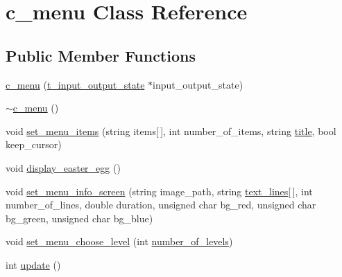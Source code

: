 \hypertarget{classc__menu}{\section{c\-\_\-menu Class Reference}
\label{classc__menu}
}
\subsection*{Public Member Functions}
\begin{DoxyCompactItemize}
\item 
\hyperlink{classc__menu_a56fe0346fcf0fcc7c351f52cfcf5adea}{c\-\_\-menu} (\hyperlink{structt__input__output__state}{t\-\_\-input\-\_\-output\-\_\-state} $\ast$input\-\_\-output\-\_\-state)
\item 
\hyperlink{classc__menu_ac8a06810d4e60f8cb2f74a82f8863759}{$\sim$c\-\_\-menu} ()
\item 
void \hyperlink{classc__menu_a35b817db8d2fa0d78dee6696846524c2}{set\-\_\-menu\-\_\-items} (string items\mbox{[}$\,$\mbox{]}, int number\-\_\-of\-\_\-items, string \hyperlink{classc__menu_a04174390379e68ec20a0ec5945748570}{title}, bool keep\-\_\-cursor)
\item 
void \hyperlink{classc__menu_afcaeabf86dfb9d715548bd8277d4bce8}{display\-\_\-easter\-\_\-egg} ()
\item 
void \hyperlink{classc__menu_ae609e23056e45e3da00fbd763d31c6fe}{set\-\_\-menu\-\_\-info\-\_\-screen} (string image\-\_\-path, string \hyperlink{classc__menu_ade57856309857147f055d82f1e7d839e}{text\-\_\-lines}\mbox{[}$\,$\mbox{]}, int number\-\_\-of\-\_\-lines, double duration, unsigned char bg\-\_\-red, unsigned char bg\-\_\-green, unsigned char bg\-\_\-blue)
\item 
void \hyperlink{classc__menu_afe00a1ae7c5f70012e3e4c510cbb2bbe}{set\-\_\-menu\-\_\-choose\-\_\-level} (int \hyperlink{classc__menu_a3fe87a5b76e64557af759a180b0bb0ae}{number\-\_\-of\-\_\-levels})
\item 
int \hyperlink{classc__menu_a13affcab2aced75886f74ff70d17b509}{update} ()
\end{DoxyCompactItemize}

